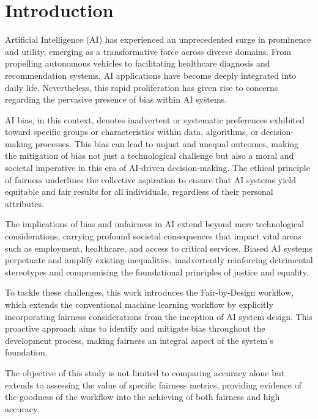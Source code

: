 \chapter{Introduction}
\label{chap:introduction}

Artificial Intelligence (AI) has experienced an unprecedented surge in prominence and utility, emerging as a transformative force across diverse domains. From propelling autonomous vehicles to facilitating healthcare diagnosis and recommendation systems, AI applications have become deeply integrated into daily life. Nevertheless, this rapid proliferation has given rise to concerns regarding the pervasive presence of bias within AI systems.

AI bias, in this context, denotes inadvertent or systematic preferences exhibited toward specific groups or characteristics within data, algorithms, or decision-making processes. This bias can lead to unjust and unequal outcomes, making the mitigation of bias not just a technological challenge but also a moral and societal imperative in this era of AI-driven decision-making. The ethical principle of fairness underlines the collective aspiration to ensure that AI systems yield equitable and fair results for all individuals, regardless of their personal attributes.

The implications of bias and unfairness in AI extend beyond mere technological considerations, carrying profound societal consequences that impact vital areas such as employment, healthcare, and access to critical services. Biased AI systems perpetuate and amplify existing inequalities, inadvertently reinforcing detrimental stereotypes and compromising the foundational principles of justice and equality.

To tackle these challenges, this work introduces the Fair-by-Design workflow, which extends the conventional machine learning workflow by explicitly incorporating fairness considerations from the inception of AI system design. This proactive approach aims to identify and mitigate bias throughout the development process, making fairness an integral aspect of the system's foundation.

The objective of this study is not limited to comparing accuracy alone but extends to assessing the value of specific fairness metrics, providing evidence of the goodness of the workflow into the achieving of both fairness and high accuracy.

